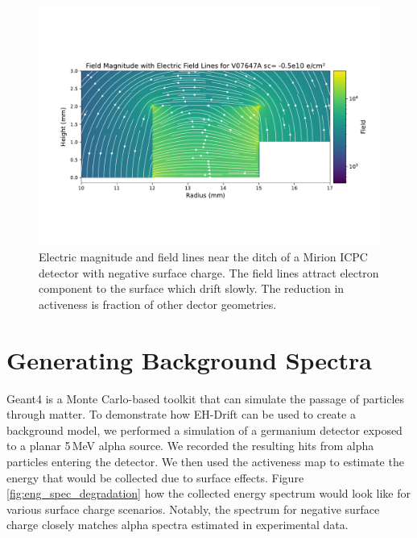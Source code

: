 \begin{figure}%
\includegraphics[trim={0cm 3cm 0cm 4.69cm},clip,width=0.99\linewidth]{ch5/figs/elect_field_lines_surface_V07647A_sc_-0.5.pdf}
\caption{Electric magnitude and field lines near the ditch of a Mirion ICPC detector with negative surface charge. The field lines attract electron component to the surface which drift slowly. The reduction in activeness is fraction of other dector geometries.}
\label{ch5_fig_elect_field_lines_surface_V07647A}
\end{figure}


\section{\label{res:3} Generating Background Spectra}

Geant4 is a Monte Carlo-based toolkit that can simulate the passage of particles through matter. To demonstrate how EH-Drift can be used to create a background model, we performed a {\geant} simulation of a germanium detector exposed to a planar 5\,MeV alpha source. We recorded the resulting hits from alpha particles entering the detector. We then used the activeness map to estimate the energy that would be collected due to surface effects. Figure \ref{fig:eng_spec_degradation} how the collected energy spectrum would look like for various surface charge scenarios. Notably, the spectrum for negative surface charge closely matches alpha spectra estimated in experimental data.


